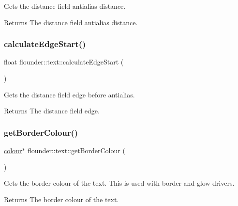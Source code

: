Gets the distance field antialias distance. 

\begin{DoxyReturn}{Returns}
The distance field antialias distance. 
\end{DoxyReturn}
\mbox{\label{classflounder_1_1text_a2a2ae8e21f3813120d01664ae1f6b946}} 
\subsubsection{\texorpdfstring{calculate\+Edge\+Start()}{calculateEdgeStart()}}
{\footnotesize\ttfamily float flounder\+::text\+::calculate\+Edge\+Start (\begin{DoxyParamCaption}{ }\end{DoxyParamCaption})}



Gets the distance field edge before antialias. 

\begin{DoxyReturn}{Returns}
The distance field edge. 
\end{DoxyReturn}
\mbox{\label{classflounder_1_1text_a9b6ae8abc8233838a5fc164845c87cde}} 
\subsubsection{\texorpdfstring{get\+Border\+Colour()}{getBorderColour()}}
{\footnotesize\ttfamily \hyperlink{classflounder_1_1colour}{colour}$\ast$ flounder\+::text\+::get\+Border\+Colour (\begin{DoxyParamCaption}{ }\end{DoxyParamCaption})\hspace{0.3cm}{\ttfamily [inline]}}



Gets the border colour of the text. This is used with border and glow drivers. 

\begin{DoxyReturn}{Returns}
The border colour of the text. 
\end{DoxyReturn}
\mbox{\label{classflounder_1_1text_aeed1638cf36d796822e56370a9f6278b}} 
